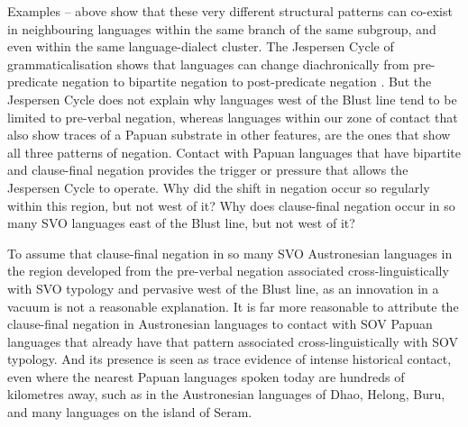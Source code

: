 Examples -- above show that these very different structural
patterns can co-exist in neighbouring languages within the same
branch of the same subgroup,
and even within the same language-dialect cluster.
The Jespersen Cycle of grammaticalisation shows that languages
can change diachronically from pre-predicate negation to bipartite
negation to post-predicate negation
\citep{Jespersen1917,Vossen2016,Fricke2017}.
But the Jespersen Cycle does not explain why languages west of
the Blust line tend to be limited to pre-verbal negation,
whereas languages within our zone of contact that also show traces
of a Papuan substrate in other features,
are the ones that show all three patterns of negation.
Contact with Papuan languages that have bipartite
and clause-final negation provides the trigger or pressure that
allows the Jespersen Cycle to operate.
Why did the shift in negation occur so regularly within this
region, but not west of it? Why does clause-final negation occur in so
many SVO languages east of the Blust line,
but not west of it?

To assume that clause-final negation in so many SVO Austronesian
languages in the region developed from the pre-verbal negation
associated cross-linguistically with SVO typology
and pervasive west of the Blust line,
as an innovation in a vacuum is not a reasonable explanation.
It is far more reasonable to attribute the clause-final negation
in Austronesian languages to contact with SOV Papuan languages
that already have that pattern associated cross-linguistically with SOV typology.
And its presence is seen as trace evidence of intense historical
contact, even where the nearest Papuan languages spoken today are hundreds
of kilometres away, such as in the Austronesian languages of Dhao,
Helong, Buru, and many languages on the island of Seram.


